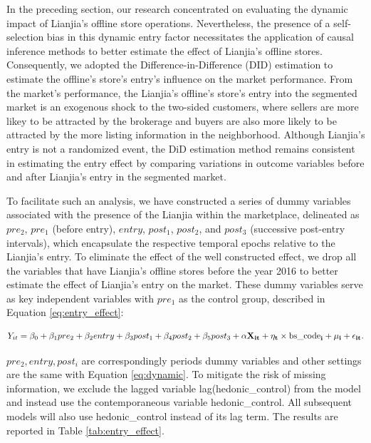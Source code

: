 \documentclass[11pt]{article}
\begin{document}
In the preceding section, our research concentrated on evaluating the dynamic impact of Lianjia's offline store operations. Nevertheless, the presence of a self-selection bias in this dynamic entry factor necessitates the application of causal inference methods to better estimate the effect of Lianjia's offline stores. Consequently, we adopted the Difference-in-Difference (DID) estimation to estimate the offline's store's entry's influence on the market performance. From the market's performance, the Lianjia's offline's store's entry into the segmented market is an exogenous shock to the two-sided customers, where sellers are more likey to be attracted by the brokerage and buyers are also more likely to be attracted by the more listing information in the neighborhood. Although Lianjia's entry is not a randomized event, the DiD estimation method remains consistent in estimating the entry effect by comparing variations in outcome variables before and after Lianjia's entry in the segmented market.

To facilitate such an analysis, we have constructed a series of dummy variables associated with the presence of the Lianjia within the marketplace, delineated as $pre_2$, $pre_1$ (before entry), $entry$, $post_1$, $post_2$, and $post_3$ (successive post-entry intervals), which encapsulate the respective temporal epochs relative to the Lianjia's entry. To eliminate the effect of the well constructed effect, we drop all the variables that have Lianjia's offline stores before the year 2016 to better estimate the effect of Lianjia's entry on the market. These dummy variables serve as key independent variables with $pre_1$ as the control group, described in Equation \eqref{eq:entry_effect}:

\begin{equation}
  Y_{it} = \beta_0 +  \beta_1 pre_2 + \beta_2 entry + \beta_3 post_1 + \beta_4 post_2 + \beta_5 post_3 + \bf{\alpha} \bf{X}_{it} + \eta_{t} \times \text{bs\_code}_i + \mu_i + \epsilon_{it}.   \label{eq:entry_effect}
\end{equation}

$pre_2, entry, post_i$ are correspondingly periods dummy variables and other settings are the same with Equation \eqref{eq:dynamic}. To mitigate the risk of missing information, we exclude the lagged variable lag(hedonic\_control) from the model and instead use the contemporaneous variable hedonic\_control. All subsequent models will also use hedonic\_control instead of its lag term. The results are reported in Table \ref{tab:entry_effect}.
\end{document}
